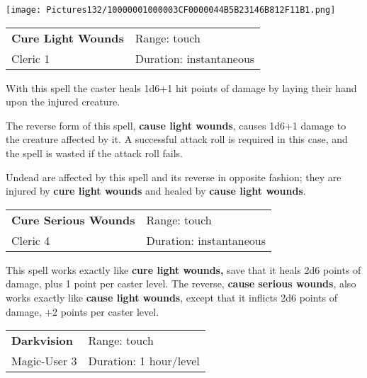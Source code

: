 \documentclass[a4paper,twoside,openany,10pt]{book}
\begin{document}
\begin{multicols}{2}
\begin{flushleft}
	\texttt{[image: Pictures132/10000001000003CF0000044B5B23146B812F11B1.png]}
\end{flushleft}

\smallskip\begin{flushleft} 
	\begin{tabularx}{0.45\textwidth}{@{}m{3.5cm}m{5.5cm}@{}} 
		\textbf{Cure Light Wounds } & Range: touch\\
		Cleric 1 &Duration: instantaneous\\
	\end{tabularx}\end{flushleft}

With this spell the caster heals 1d6+1 hit points of damage by laying
their hand upon the injured creature.

The reverse form of this spell, \textbf{cause light wounds}, causes 1d6+1 damage to the creature affected by it. A successful attack roll is required in this case, and the spell is wasted if the attack roll fails.

Undead are affected by this spell and its reverse in opposite fashion; they are injured by \textbf{cure light wounds} and healed by \textbf{cause light wounds}.

\smallskip\begin{flushleft} 
	\begin{tabularx}{0.45\textwidth}{@{}m{3.5cm}m{5.5cm}@{}} 
		\textbf{Cure Serious Wounds} & Range: touch\\
		Cleric 4 &Duration: instantaneous\\
	\end{tabularx}\end{flushleft}

This spell works exactly like \textbf{cure light wounds,} save that it heals 2d6 points of damage, plus 1 point per caster level. The reverse, \textbf{cause serious wounds}, also works exactly like \textbf{cause light wounds}, except that it inflicts 2d6 points of damage, +2 points per caster level.\medskip


\smallskip\begin{flushleft} 
	\begin{tabularx}{0.45\textwidth}{@{}m{3.5cm}m{5.5cm}@{}} 
		\textbf{Darkvision} & Range: touch\\
Magic-User 3 &Duration: 1 hour/level\\
	\end{tabularx}\end{flushleft}


\end{multicols}
\end{document}
